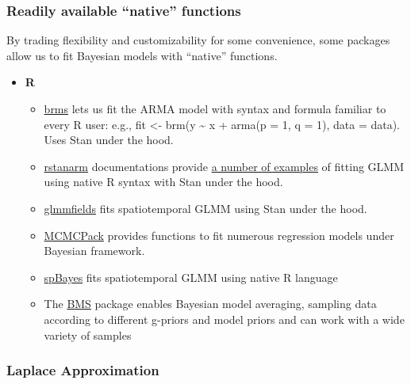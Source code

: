 \documentclass[
]{book}
\providecommand{\tightlist}{%
  \setlength{\itemsep}{0pt}\setlength{\parskip}{0pt}}
\begin{document}
\hypertarget{readily-available-native-functions}{%
\subsubsection{Readily available ``native'' functions}\label{readily-available-native-functions}}

By trading flexibility and customizability for some convenience, some packages allow us to fit Bayesian models with ``native'' functions.

\begin{itemize}
\tightlist
\item
  \textbf{R}

  \begin{itemize}
  \tightlist
  \item
    \href{https://cran.r-project.org/web/packages/brms/index.html}{brms} lets us fit the ARMA model with syntax and formula familiar to every R user: e.g., fit \textless- brm(y \textasciitilde{} x + arma(p = 1, q = 1), data = data). Uses Stan under the hood.
  \item
    \href{https://cran.r-project.org/web/packages/rstanarm/index.html}{rstanarm} documentations provide \href{https://mc-stan.org/rstanarm/articles/}{a number of examples} of fitting GLMM using native R syntax with Stan under the hood.
  \item
    \href{https://github.com/seananderson/glmmfields}{glmmfields} fits spatiotemporal GLMM using Stan under the hood.
  \item
    \href{https://cran.r-project.org/web/packages/MCMCpack/index.html}{MCMCPack} provides functions to fit numerous regression models under Bayesian framework.
  \item
    \href{https://cran.r-project.org/web/packages/spBayes/index.html}{spBayes} fits spatiotemporal GLMM using native R language
  \item
    The \href{http://bms.zeugner.eu/}{BMS} package enables Bayesian model averaging, sampling data according to different g-priors and model priors and can work with a wide variety of samples
  \end{itemize}
\end{itemize}

\hypertarget{laplace-approximation}{%
\subsubsection{Laplace Approximation}\label{laplace-approximation}}
\end{document}
